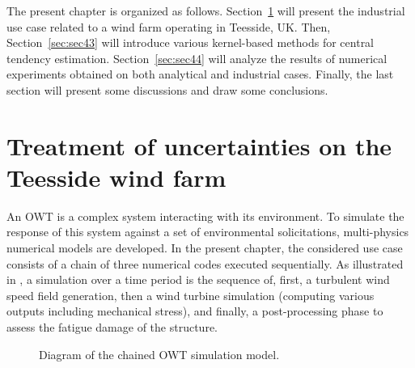 The present chapter is organized as follows. 
Section~\ref{sec:sec42} will present the industrial use case related to a wind farm operating in Teesside, UK. 
Then, Section~\ref{sec:sec43} will introduce various kernel-based methods for central tendency estimation. 
Section~\ref{sec:sec44} will analyze the results of numerical experiments obtained on both analytical and industrial cases. 
Finally, the last section will present some discussions and draw some conclusions.


\section{Treatment of uncertainties on the Teesside wind farm}\label{sec:sec42}

An OWT is a complex system interacting with its environment. 
To simulate the response of this system against a set of environmental solicitations, multi-physics numerical models are developed. 
In the present chapter, the considered use case consists of a chain of three numerical codes executed sequentially. 
As illustrated in , a simulation over a time period is the sequence of, first, a turbulent wind speed field generation, then a wind turbine simulation (computing various outputs including mechanical stress), and finally, a post-processing phase to assess the fatigue damage of the structure.
\begin{figure}
\begin{center}
    
\end{center}
\caption{Diagram of the chained OWT simulation model.}
\label{fig:bloc_diagram}
\end{figure}


